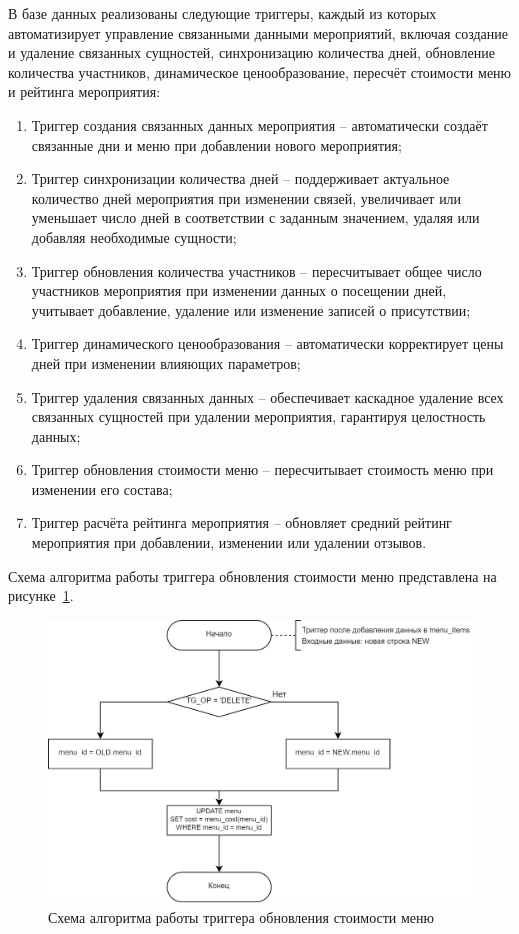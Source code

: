 В базе данных реализованы следующие триггеры, каждый из которых автоматизирует управление связанными данными мероприятий, включая создание и удаление связанных сущностей, синхронизацию количества дней, обновление количества участников, динамическое ценообразование, пересчёт стоимости меню и рейтинга мероприятия:
\begin{enumerate}
	\item Триггер создания связанных данных мероприятия --  автоматически создаёт связанные дни и меню при добавлении нового мероприятия;
	\item Триггер синхронизации количества дней -- поддерживает актуальное количество дней мероприятия при изменении связей, увеличивает или уменьшает число дней в соответствии с заданным значением, удаляя или добавляя необходимые сущности;
	\item Триггер обновления количества участников -- пересчитывает общее число участников мероприятия при изменении данных о посещении дней, учитывает добавление, удаление или изменение записей о присутствии;
	\item Триггер динамического ценообразования -- автоматически корректирует цены дней при изменении влияющих параметров;
	\item Триггер удаления связанных данных -- обеспечивает каскадное удаление всех связанных сущностей при удалении мероприятия, гарантируя целостность данных;
	\item Триггер обновления стоимости меню -- пересчитывает стоимость меню при изменении его состава;
	\item Триггер расчёта рейтинга мероприятия -- обновляет средний рейтинг мероприятия при добавлении, изменении или удалении отзывов.
\end{enumerate}

Схема алгоритма работы триггера обновления стоимости меню представлена на рисунке~\ref{fig:menu-diagram}.

\begin{figure}[h]
	\centering
	\includegraphics[width=1\textwidth]{images/tg-diagram.png}
	\caption{Схема алгоритма работы триггера обновления стоимости меню} 
	\label{fig:menu-diagram} 
\end{figure}

